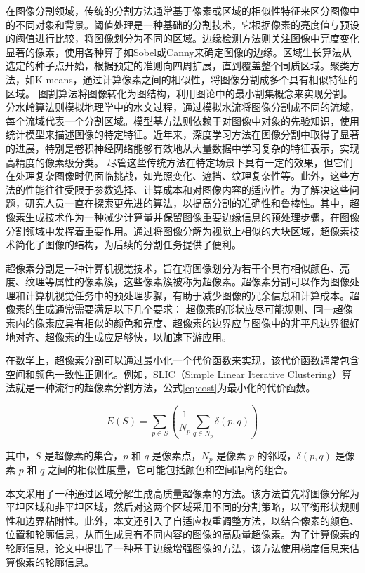 在图像分割领域，传统的分割方法通常基于像素或区域的相似性特征来区分图像中的不同对象和背景。阈值处理是一种基础的分割技术，它根据像素的亮度值与预设的阈值进行比较，将图像划分为不同的区域。边缘检测方法则关注图像中亮度变化显著的像素，使用各种算子如Sobel或Canny来确定图像的边缘。区域生长算法从选定的种子点开始，根据预定的准则向四周扩展，直到覆盖整个同质区域。聚类方法，如K-means，通过计算像素之间的相似性，将图像分割成多个具有相似特征的区域。
图割算法将图像转化为图结构，利用图论中的最小割集概念来实现分割。分水岭算法则模拟地理学中的水文过程，通过模拟水流将图像分割成不同的流域，每个流域代表一个分割区域。模型基方法则依赖于对图像中对象的先验知识，使用统计模型来描述图像的特定特征。近年来，深度学习方法在图像分割中取得了显著的进展，特别是卷积神经网络能够有效地从大量数据中学习复杂的特征表示，实现高精度的像素级分类。
尽管这些传统方法在特定场景下具有一定的效果，但它们在处理复杂图像时仍面临挑战，如光照变化、遮挡、纹理复杂性等。此外，这些方法的性能往往受限于参数选择、计算成本和对图像内容的适应性。为了解决这些问题，研究人员一直在探索更先进的算法，以提高分割的准确性和鲁棒性。其中，超像素生成技术作为一种减少计算量并保留图像重要边缘信息的预处理步骤，在图像分割领域中发挥着重要作用。通过将图像分解为视觉上相似的大块区域，超像素技术简化了图像的结构，为后续的分割任务提供了便利。\cite{JSJA2023S1052}

超像素分割是一种计算机视觉技术，旨在将图像划分为若干个具有相似颜色、亮度、纹理等属性的像素簇，这些像素簇被称为超像素。超像素分割可以作为图像处理和计算机视觉任务中的预处理步骤，有助于减少图像的冗余信息和计算成本。超像素的生成通常需要满足以下几个要求：
超像素的形状应尽可能规则、同一超像素内的像素应具有相似的颜色和亮度、超像素的边界应与图像中的非平凡边界很好地对齐、超像素的生成应足够快，以加速下游应用。

在数学上，超像素分割可以通过最小化一个代价函数来实现，该代价函数通常包含空间和颜色一致性正则化。例如，SLIC（Simple Linear Iterative Clustering）算法就是一种流行的超像素分割方法，公式\eqref{eq:cost}为最小化的代价函数。

\begin{equation}
  E(S) = \sum_{p \in S} \left( \frac{1}{N_p} \sum_{q \in N_p} \delta(p, q) \right)
  \label{eq:cost}
\end{equation}

其中，\(S\) 是超像素的集合，\(p\) 和 \(q\) 是像素点，\(N_p\) 是像素 \(p\) 的邻域，\(\delta(p, q)\) 是像素 \(p\) 和 \(q\) 之间的相似性度量，它可能包括颜色和空间距离的组合。

本文采用了一种通过区域分解生成高质量超像素的方法。该方法首先将图像分解为平坦区域和非平坦区域，然后对这两个区域采用不同的分割策略，以平衡形状规则性和边界粘附性。此外，本文还引入了自适应权重调整方法，以结合像素的颜色、位置和轮廓信息，从而生成具有不同内容的图像的高质量超像素。为了计算像素的轮廓信息，论文中提出了一种基于边缘增强图像的方法，该方法使用梯度信息来估算像素的轮廓信息。


